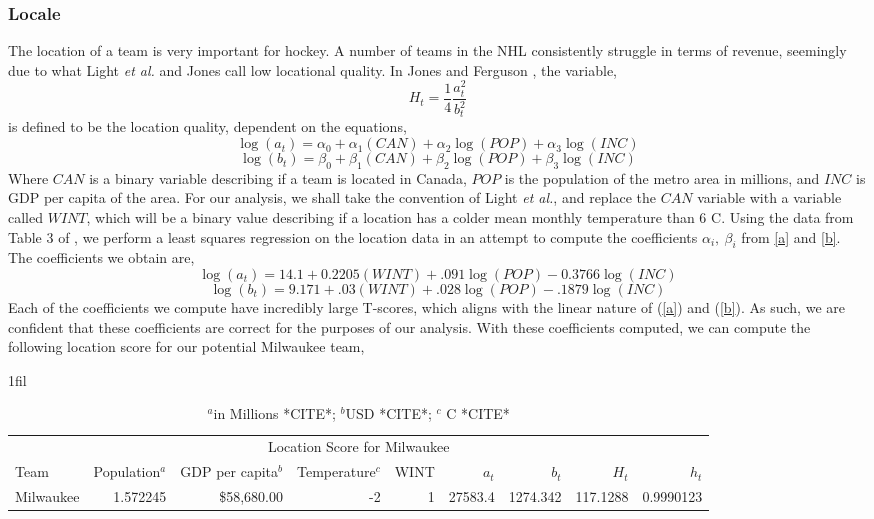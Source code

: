 \documentclass[11pt]{report}            %
\makeatletter
\newcommand*{\centerfloat}{%
  \parindent \z@
  \leftskip \z@ \@plus 1fil \@minus \textwidth
  \rightskip\leftskip
  \parfillskip \z@skip}
\makeatother
\begin{document}
\subsubsection*{Locale}
The location of a team is very important for hockey. A number of teams in the NHL consistently struggle in terms of revenue, seemingly due to what Light \textit{et al.} and Jones call low locational quality\cite{light}\cite{jones}. In Jones and Ferguson \cite{jones}, the variable,
\begin{equation}\label{ht}
H_t=\frac{1}{4}\frac{a_t^2}{b_t^2}
\end{equation}
is defined to be the location quality, dependent on the equations,
\begin{equation}\label{a}
\log(a_t) = \alpha_0+\alpha_1(CAN)+\alpha_2\log(POP)+\alpha_3\log(INC)
\end{equation}
\begin{equation}\label{b}
\log(b_t) = \beta_0+\beta_1(CAN)+\beta_2\log(POP)+\beta_3\log(INC)
\end{equation}
Where $CAN$ is a binary variable describing if a team is located in Canada, $POP$ is the population of the metro area in millions, and $INC$ is GDP per capita of the area. For our analysis, we shall take the convention of Light \textit{et al.}, and replace the $CAN$ variable with a variable called $WINT$, which will be a binary value describing if a location has a colder mean monthly temperature than 6 \degree C. Using the data from Table 3 of \cite{light}, we perform a least squares regression on the location data in an attempt to compute the coefficients $\alpha_i,\ \beta_i$ from \ref{a} and \ref{b}. The coefficients we obtain are,
\begin{equation}\label{acoeff}
\log(a_t) = 14.1 + 0.2205(WINT)+.091\log(POP)-0.3766\log(INC)
\end{equation}
\begin{equation}\label{bcoeff}
\log(b_t) = 9.171 + .03(WINT)+.028\log(POP)-.1879\log(INC)
\end{equation}
Each of the coefficients we compute have incredibly large T-scores, which aligns with the linear nature of (\ref{a}) and (\ref{b}). As such, we are confident that these coefficients are correct for the purposes of our analysis. With these coefficients computed, we can compute the following location score for our potential Milwaukee team,
\begin{table}[H]
\centerfloat
\begin{tabular}{lrrrrrrrr}
\hline
\multicolumn{9}{c}{Location Score for Milwaukee} \\
Team & Population$^a$ & GDP per capita$^b$ & Temperature$^c$ & WINT & $a_t$ & $b_t$ & $H_t$ & $h_t$\\
\hline
Milwaukee & 1.572245 & \$58,680.00 & -2 & 1 & 27583.4 & 1274.342 & 117.1288 & 0.9990123
\end{tabular}
\caption{$^a$in Millions *CITE*; $^b$USD *CITE*; $^c$ \degree C *CITE*}
\label{table:Milwaukee_H}
\end{table}
\end{document}
